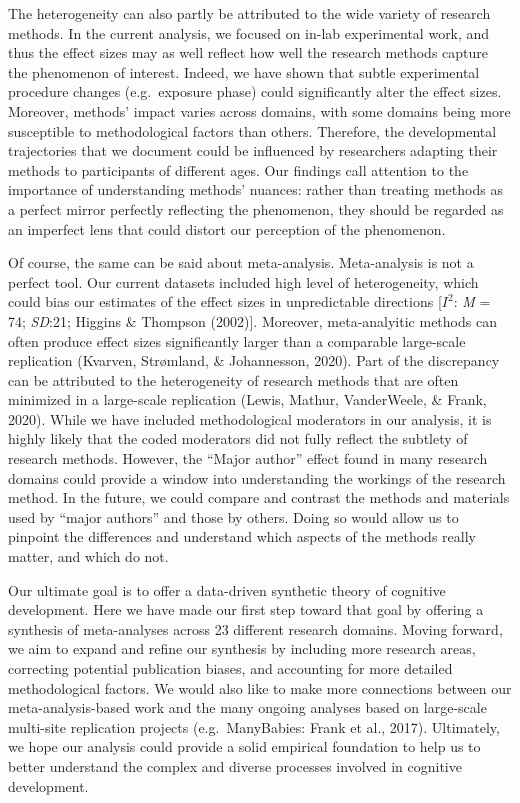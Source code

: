 \documentclass[10pt, letterpaper]{article}
\begin{document}
The heterogeneity can also partly be attributed to the wide variety of
research methods. In the current analysis, we focused on in-lab
experimental work, and thus the effect sizes may as well reflect how
well the research methods capture the phenomenon of interest. Indeed, we
have shown that subtle experimental procedure changes (e.g.~exposure
phase) could significantly alter the effect sizes. Moreover, methods'
impact varies across domains, with some domains being more susceptible
to methodological factors than others. Therefore, the developmental
trajectories that we document could be influenced by researchers
adapting their methods to participants of different ages. Our findings
call attention to the importance of understanding methods' nuances:
rather than treating methods as a perfect mirror perfectly reflecting
the phenomenon, they should be regarded as an imperfect lens that could
distort our perception of the phenomenon.

Of course, the same can be said about meta-analysis. Meta-analysis is
not a perfect tool. Our current datasets included high level of
heterogeneity, which could bias our estimates of the effect sizes in
unpredictable directions {[}\(I^2\): \emph{M} = 74; \emph{SD}:21;
Higgins \& Thompson (2002){]}. Moreover, meta-analyitic methods can
often produce effect sizes significantly larger than a comparable
large-scale replication (Kvarven, Strømland, \& Johannesson, 2020). Part
of the discrepancy can be attributed to the heterogeneity of research
methods that are often minimized in a large-scale replication (Lewis,
Mathur, VanderWeele, \& Frank, 2020). While we have included
methodological moderators in our analysis, it is highly likely that the
coded moderators did not fully reflect the subtlety of research methods.
However, the ``Major author'' effect found in many research domains
could provide a window into understanding the workings of the research
method. In the future, we could compare and contrast the methods and
materials used by ``major authors'' and those by others. Doing so would
allow us to pinpoint the differences and understand which aspects of the
methods really matter, and which do not.

Our ultimate goal is to offer a data-driven synthetic theory of
cognitive development. Here we have made our first step toward that goal
by offering a synthesis of meta-analyses across 23 different research
domains. Moving forward, we aim to expand and refine our synthesis by
including more research areas, correcting potential publication biases,
and accounting for more detailed methodological factors. We would also
like to make more connections between our meta-analysis-based work and
the many ongoing analyses based on large-scale multi-site replication
projects (e.g.~ManyBabies: Frank et al., 2017). Ultimately, we hope our
analysis could provide a solid empirical foundation to help us to better
understand the complex and diverse processes involved in cognitive
development.
\end{document}
